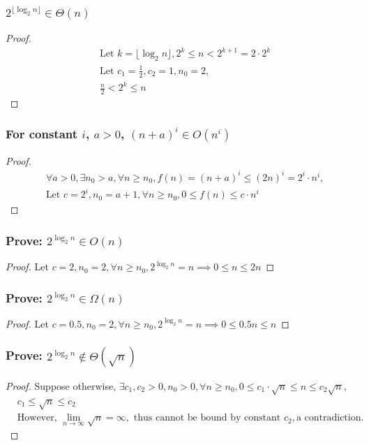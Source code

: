 \documentclass[9pt]{extarticle}
\begin{document}
\subsubsection*{$2^{\lfloor \log_2n \rfloor} \in \Theta(n)$}
\begin{proof}
    \begin{align*}
        & \text{Let } k = \lfloor \log_2 n\rfloor, 2^k \leq n < 2^{k+1} = 2 \cdot 2^k\\
        & \text{Let } c_1 = \frac{1}{2}, c_2 = 1, n_0 = 2, \\
        & \frac{n}{2} < 2^k \leq n
    \end{align*}
\end{proof}

\subsubsection*{For constant $i$, $a > 0$, $(n + a)^i \in O(n^i)$}
\begin{proof}
    \begin{align*}
        & \forall a > 0, \exists n_0 > a, \forall n \geq n_0, f(n) = (n + a)^i \leq (2n)^i = 2^i \cdot n^i, \\
        &\text{Let } c = 2^i, n_0 = a + 1, \forall n \geq n_0, 0 \leq f(n) \leq c \cdot n^i
    \end{align*}
\end{proof}
\subsubsection*{Prove: $2^{\log_2n} \in O(n)$}
\begin{proof}
    Let $c = 2, n_0 = 2, \forall n \geq n_0, 2^{\log_2n} = n \implies 0 \leq n \leq 2n$
\end{proof}
\subsubsection*{Prove: $2^{\log_2n} \in \Omega(n)$}
\begin{proof}
    Let $c = 0.5, n_0 = 2, \forall n \geq n_0, 2^{\log_2n} = n \implies 0 \leq 0.5n \leq n$
\end{proof}
\subsubsection*{Prove: $2^{\log_2n} \notin \Theta(\sqrt{n})$}
\begin{proof}
    Suppose otherwise, $\exists c_1, c_2 > 0, n_0 > 0, \forall n \geq n_0, 0 \leq c_1 \cdot \sqrt{n} \leq n \leq c_2 \sqrt{n}$,\\
    \begin{align*}
        & c_1 \leq \sqrt{n} \leq c_2\\
        & \text{However, } \lim_{n \rightarrow \infty} \sqrt{n}= \infty, \text{ thus cannot be bound by constant } c_2, \text{a contradiction.}
    \end{align*}
\end{proof}
\end{document}
